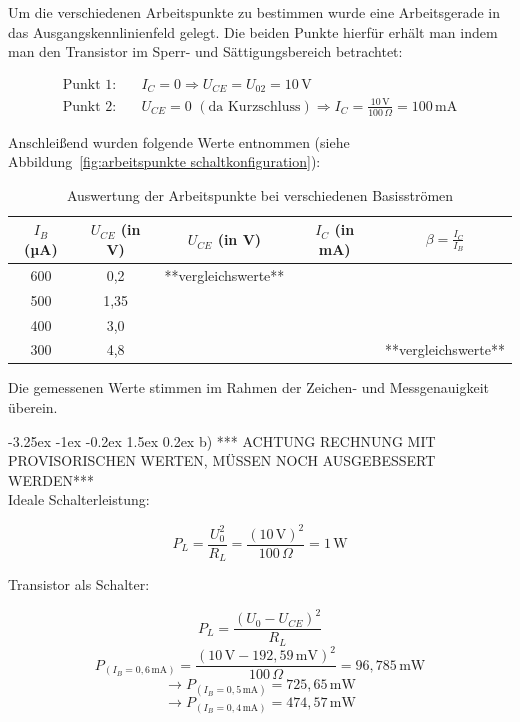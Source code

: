 \documentclass[
	a4paper, %
	12pt, %
]{CSUniSchoolLabReport}
\makeatletter
\renewcommand\paragraph{\@startsection{paragraph}{4}{\z@}%
  {-3.25ex \@plus -1ex \@minus -0.2ex}%
  {1.5ex \@plus 0.2ex}%
  {\normalfont\normalsize\bfseries}}
\makeatother
\begin{document}
Um die verschiedenen Arbeitspunkte zu bestimmen wurde eine Arbeitsgerade in das Ausgangskennlinienfeld gelegt. Die beiden Punkte hierfür erhält man indem man den Transistor im Sperr- und Sättigungsbereich betrachtet:

\begin{align*}
\text{Punkt 1:} \quad & I_C = 0 \Rightarrow U_{CE} = U_{02} = 10\,\text{V} \\
\text{Punkt 2:} \quad & U_{CE} = 0 \,\, (\text{da Kurzschluss}) \Rightarrow I_C = \frac{10\,\text{V}}{100\,\Omega} = 100\,\text{mA}
\end{align*}

\vspace{1em}

Anschleißend wurden folgende Werte entnommen (siehe Abbildung~\ref{fig:arbeitspunkte schaltkonfiguration}):

\begin{table}[H]
\centering
\begin{tabular}{c|c|c|c|c}
$I_B$ (µA) & $U_{CE}$ (in V) & $U_{CE}$ (in V) & $I_C$ (in mA) & $\beta = \frac{I_C}{I_B}$ \\ \hline
600 & 0,2 & **vergleichswerte** &  &  \\ \hline
500 & 1,35 &  &  &  \\ \hline
400 & 3,0 &  &  &  \\ \hline
300 & 4,8 &  &  &  **vergleichswerte**
\end{tabular}
\caption{Auswertung der Arbeitspunkte bei verschiedenen Basisströmen}
\label{tab:arbeitspunkte}
\end{table}

Die gemessenen Werte stimmen im Rahmen der Zeichen- und Messgenauigkeit überein.

\paragraph{b)}
*** ACHTUNG RECHNUNG MIT PROVISORISCHEN WERTEN, MÜSSEN NOCH AUSGEBESSERT WERDEN***\\

Ideale Schalterleistung:

\[
P_L = \frac{U_0^2}{R_L} = \frac{(10\,\text{V})^2}{100\,\Omega} = 1\,\text{W}
\]

Transistor als Schalter:

\[
P_L = \frac{(U_0 - U_{CE})^2}{R_L}
\]
\vspace{1em}
\[
P_{(I_B = 0{,}6\,\text{mA})} = \frac{(10\,\text{V} - 192{,}59\,\text{mV})^2}{100\,\Omega} = 96{,}785\,\text{mW}
\]
\vspace{1em}
\[
\rightarrow P_{(I_B = 0{,}5\,\text{mA})} = 725{,}65\,\text{mW}
\]
\[
\rightarrow P_{(I_B = 0{,}4\,\text{mA})} = 474{,}57\,\text{mW}
\]
\end{document}
